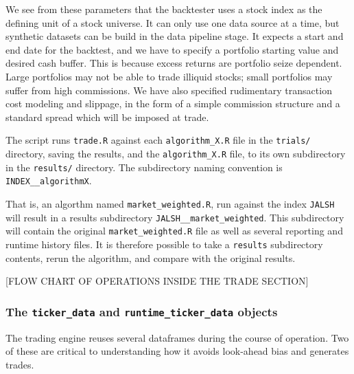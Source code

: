 \documentclass[11pt,preprint, authoryear]{elsarticle}
\numberwithin{equation}{section}
\numberwithin{figure}{section}
\numberwithin{table}{section}
\begin{document}
We see from these parameters that the backtester uses a stock index as
the defining unit of a stock universe. It can only use one data source
at a time, but synthetic datasets can be build in the data pipeline
stage. It expects a start and end date for the backtest, and we have to
specify a portfolio starting value and desired cash buffer. This is
because excess returns are portfolio seize dependent. Large portfolios
may not be able to trade illiquid stocks; small portfolios may suffer
from high commissions. We have also specified rudimentary transaction
cost modeling and slippage, in the form of a simple commission structure
and a standard spread which will be imposed at trade.

The script runs \texttt{trade.R} against each \texttt{algorithm\_X.R}
file in the \texttt{trials/} directory, saving the results, and the
\texttt{algorithm\_X.R} file, to its own subdirectory in the
\texttt{results/} directory. The subdirectory naming convention is
\texttt{INDEX\_\_algorithmX}.

That is, an algorthm named \texttt{market\_weighted.R}, run against the
index \texttt{JALSH} will result in a results subdirectory
\texttt{JALSH\_\_market\_weighted}. This subdirectory will contain the
original \texttt{market\_weighted.R} file as well as several reporting
and runtime history files. It is therefore possible to take a
\texttt{results} subdirectory contents, rerun the algorithm, and compare
with the original results.

{[}FLOW CHART OF OPERATIONS INSIDE THE TRADE SECTION{]}

\subsubsection{\texorpdfstring{The \texttt{ticker\_data} and
\texttt{runtime\_ticker\_data}
objects}{The ticker\_data and runtime\_ticker\_data objects}}\label{the-ticker_data-and-runtime_ticker_data-objects}

The trading engine reuses several dataframes during the course of
operation. Two of these are critical to understanding how it avoids
look-ahead bias and generates trades.
\end{document}
